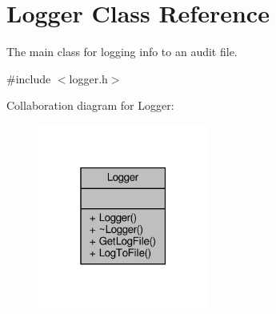 \hypertarget{classLogger}{}\section{Logger Class Reference}
\label{classLogger}


The main class for logging info to an audit file.  




{\ttfamily \#include $<$logger.\+h$>$}



Collaboration diagram for Logger\+:\nopagebreak
\begin{figure}[H]
\begin{center}
\leavevmode
\includegraphics[width=159pt]{classLogger__coll__graph}
\end{center}
\end{figure}
